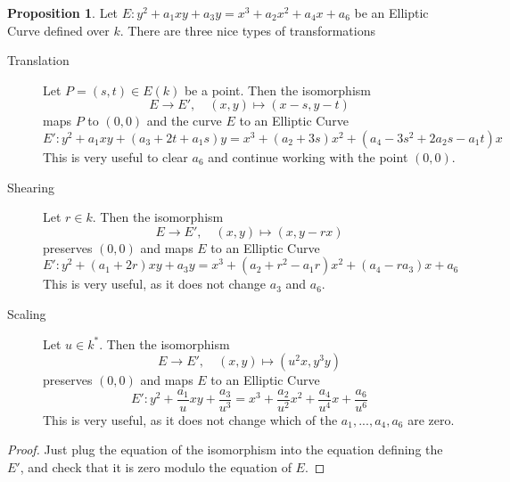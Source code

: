 \documentclass{scrartcl}
\theoremstyle{definition}
\newtheorem{prop}[subsection]{Proposition}
\begin{document}
\begin{prop}
    \label{prop:weierstrass_transformations}
    Let $E: y^2 + a_1 x y + a_3 y = x^3 + a_2 x^2 + a_4 x + a_6$ be an Elliptic Curve defined over $k$.
    There are three nice types of transformations
    \begin{description}
        \item[Translation] Let $P = (s, t) \in E(k)$ be a point. Then the isomorphism
        \begin{equation*}
            E \to E', \quad (x, y) \mapsto (x - s, y - t)
        \end{equation*}
        maps $P$ to $(0, 0)$ and the curve $E$ to an Elliptic Curve
        \begin{equation*}
            E': y^2 + a_1 x y + (a_3 + 2t + a_1 s) y = x^3 + (a_2 + 3 s) x^2 + (a_4 - 3 s^2 + 2 a_2 s - a_1 t) x
        \end{equation*}
        This is very useful to clear $a_6$ and continue working with the point $(0, 0)$.
        \item[Shearing] Let $r \in k$. Then the isomorphism
        \begin{equation*}
            E \to E', \quad (x, y) \mapsto (x, y - r x)
        \end{equation*}
        preserves $(0, 0)$ and maps $E$ to an Elliptic Curve
        \begin{equation*}
            E': y^2 + (a_1 + 2r) x y + a_3 y = x^3 + (a_2 + r^2 - a_1 r) x^2 + (a_4 - r a_3) x + a_6
        \end{equation*}
        This is very useful, as it does not change $a_3$ and $a_6$.
        \item[Scaling] Let $u \in k^*$. Then the isomorphism
        \begin{equation*}
            E \to E', \quad (x, y) \mapsto (u^2 x, y^3 y)
        \end{equation*}
        preserves $(0, 0)$ and maps $E$ to an Elliptic Curve
        \begin{equation*}
            E': y^2 + \frac {a_1} u x y + \frac {a_3} {u^3} = x^3 + \frac {a_2} {u^2} x^2 + \frac {a_4} {u^4} x + \frac {a_6} {u^6}
        \end{equation*}
        This is very useful, as it does not change which of the $a_1, ..., a_4, a_6$ are zero.
    \end{description}
\end{prop}
\begin{proof}
    Just plug the equation of the isomorphism into the equation defining the $E'$, and check that it is zero modulo the equation of $E$.
\end{proof}
\end{document}
